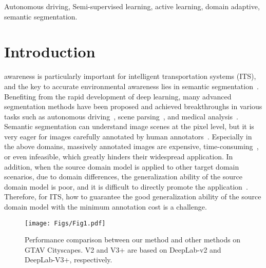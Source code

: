\documentclass[journal]{IEEEtran}
\begin{document}
\begin{IEEEkeywords}
Autonomous driving, Semi-supervised learning, active learning, domain adaptive, semantic segmentation.
\end{IEEEkeywords}

\IEEEpeerreviewmaketitle

\section{Introduction}
\label{sec:intro}
 awareness is particularly important for intelligent transportation systems (ITS), and the key to accurate environmental awareness lies in semantic segmentation~\cite{9529067, 9042876}. Benefiting from the rapid development of deep learning, many advanced segmentation methods have been proposed and achieved breakthroughs in various tasks such as autonomous driving~\cite{geiger2012we}, scene parsing~\cite{cordts2016cityscapes}, and medical analysis~\cite{asgari2021deep}. Semantic segmentation can understand image scenes at the pixel level, but it is very eager for images carefully annotated by human annotators~\cite{zhang2018context}. Especially in the above domains, massively annotated images are expensive, time-consuming~\cite{cordts2016cityscapes}, or even infeasible, which greatly hinders their widespread application. In addition, when the source domain model is applied to other target domain scenarios, due to domain differences, the generalization ability of the source domain model is poor, and it is difficult to directly promote the application~\cite{10021219}. Therefore, for ITS, how to guarantee the good generalization ability of the source domain model with the minimum annotation cost is a challenge.

\begin{figure}[!t]
  \centering
  \texttt{[image: Figs/Fig1.pdf]}
  \caption{Performance comparison between our method and other methods on GTAV  Cityscapes. V2 and V3+ are based on DeepLab-v2 and DeepLab-V3+, respectively.}
  \label{fig1}
  \vspace{-4mm}
\end{figure}
\end{document}
